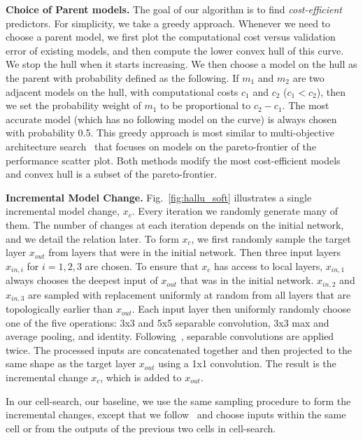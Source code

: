 \documentclass{article}
\begin{document}
\textbf{Choice of Parent models.}
\label{sec:choose_parent}
The goal of our algorithm is to find \emph{cost-efficient} predictors. For simplicity, we take a greedy approach. Whenever we need to choose a parent model, we first plot the computational cost versus validation error of existing models, and then compute the lower convex hull of this curve. We stop the hull when it starts increasing. We then choose a model on the hull as the parent with probability defined as the following.
If $m_1$ and $m_2$ are two adjacent models on the hull, with computational costs $c_1$ and $c_2$ ($c_1 < c_2$), then we set the probability weight of $m_1$ to be proportional to $c_2 - c_1$. The most accurate model (which has no following model on the curve) is always chosen with probability 0.5. This greedy approach is most similar to multi-objective architecture search~\citep{Elsken2018EfficientMN, Hsu2018MONASMN} that focuses on models on the pareto-frontier of the performance scatter plot. Both methods modify the most cost-efficient models and convex hull is a subset of the pareto-frontier.

\textbf{Incremental Model Change.}
\label{sec:candidate_layers}
Fig.~\ref{fig:hallu_soft} illustrates a single incremental model change, $x_c$. Every iteration we randomly generate many of them. The number of changes at each iteration depends on the initial network, and we detail the relation later. To form $x_c$, we first randomly sample the target layer $x_{out}$ from layers that were in the initial network. Then three input layers $x_{in,i}$ for $i=1,2,3$ are chosen. To ensure that $x_c$ has access to local layers, $x_{in,1}$ always chooses the deepest input of $x_{out}$ that was in the initial network. $x_{in,2}$ and $x_{in,3}$ are sampled with replacement uniformly at random from all layers that are topologically earlier than $x_{out}$.
Each input layer then uniformly randomly choose one of the five operations: 3x3 and 5x5 separable convolution, 3x3 max and average pooling, and identity. Following~\citep{NASCell,Real2018RegularizedEF,Pham2018EfficientNA}, separable convolutions are applied twice. 
The processed inputs are concatenated together and then projected to the same shape as the target layer $x_{out}$ using a 1x1 convolution. The result is the incremental change $x_c$, which is added to $x_{out}$. 

In our cell-search, our baseline, we use the same sampling procedure to form the incremental changes, except that we follow~\citep{NASCell} and choose inputs within the same cell or from the outputs of the previous two cells in cell-search.
\end{document}
